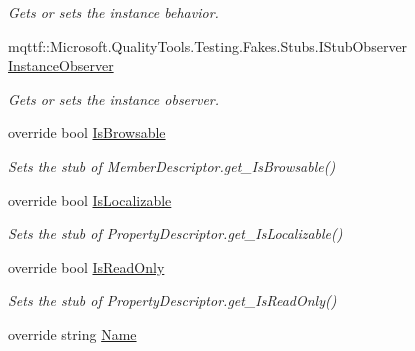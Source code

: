 \begin{DoxyCompactItemize}
\begin{DoxyCompactList}\small\item\em Gets or sets the instance behavior.\end{DoxyCompactList}\item 
mqttf\-::\-Microsoft.\-Quality\-Tools.\-Testing.\-Fakes.\-Stubs.\-I\-Stub\-Observer \hyperlink{class_system_1_1_component_model_1_1_fakes_1_1_stub_property_descriptor_acc04999259716a34bdd0bc60d05a8f66}{Instance\-Observer}
\begin{DoxyCompactList}\small\item\em Gets or sets the instance observer.\end{DoxyCompactList}\item 
override bool \hyperlink{class_system_1_1_component_model_1_1_fakes_1_1_stub_property_descriptor_abbaa6f93d6ff31ff30a9150f6364ef7b}{Is\-Browsable}
\begin{DoxyCompactList}\small\item\em Sets the stub of Member\-Descriptor.\-get\-\_\-\-Is\-Browsable()\end{DoxyCompactList}\item 
override bool \hyperlink{class_system_1_1_component_model_1_1_fakes_1_1_stub_property_descriptor_afe5d7698440fb4ff2bd859fe031ccd96}{Is\-Localizable}
\begin{DoxyCompactList}\small\item\em Sets the stub of Property\-Descriptor.\-get\-\_\-\-Is\-Localizable()\end{DoxyCompactList}\item 
override bool \hyperlink{class_system_1_1_component_model_1_1_fakes_1_1_stub_property_descriptor_a4898d62c5e0bb76518e4baa1c6ffc84a}{Is\-Read\-Only}
\begin{DoxyCompactList}\small\item\em Sets the stub of Property\-Descriptor.\-get\-\_\-\-Is\-Read\-Only()\end{DoxyCompactList}\item 
override string \hyperlink{class_system_1_1_component_model_1_1_fakes_1_1_stub_property_descriptor_a2ef40a55f93e49f6c5a0f21f3c45c2e5}{Name}

\end{DoxyCompactItemize}

